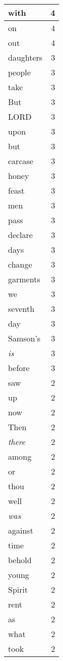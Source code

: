 \begin{center}
\begin{longtable}{l|r}
with & 4\\ \hline 
on & 4\\ \hline 
out & 4\\ \hline 
daughters & 3\\ \hline 
people & 3\\ \hline 
take & 3\\ \hline 
But & 3\\ \hline 
LORD & 3\\ \hline 
upon & 3\\ \hline 
but & 3\\ \hline 
carcase & 3\\ \hline 
honey & 3\\ \hline 
feast & 3\\ \hline 
men & 3\\ \hline 
pass & 3\\ \hline 
declare & 3\\ \hline 
days & 3\\ \hline 
change & 3\\ \hline 
garments & 3\\ \hline 
we & 3\\ \hline 
seventh & 3\\ \hline 
day & 3\\ \hline 
Samson's & 3\\ \hline 
\emph{is} & 3\\ \hline 
before & 3\\ \hline 
saw & 2\\ \hline 
up & 2\\ \hline 
now & 2\\ \hline 
Then & 2\\ \hline 
\emph{there} & 2\\ \hline 
among & 2\\ \hline 
or & 2\\ \hline 
thou & 2\\ \hline 
well & 2\\ \hline 
\emph{was} & 2\\ \hline 
against & 2\\ \hline 
time & 2\\ \hline 
behold & 2\\ \hline 
young & 2\\ \hline 
Spirit & 2\\ \hline 
rent & 2\\ \hline 
as & 2\\ \hline 
what & 2\\ \hline 
took & 2\\ \hline 

\end{longtable}
\end{center}
